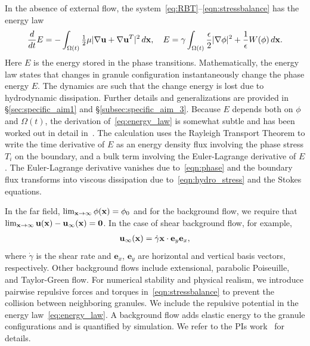 In the absence of external flow, the
system~\eqref{eq:RBT}--\eqref{eqn:stressbalance} has the energy law
\begin{align}
\label{eq:energy_law}
  \frac{d}{dt}E
  = - \int_{\Omega(t)}\tfrac{1}{2}\mu|\nabla \mathbf{u} + \nabla
  \mathbf{u}^T|^2 \,d\mathbf{x},\quad
    E = \gamma \int_{\Omega(t)}
  \frac{\epsilon}{2} |\nabla \phi|^2 + \frac{1}{\epsilon} W(\phi) \,d\mathbf{x}.
\end{align}
Here $E$ is the energy stored in the phase transitions. Mathematically,
the energy law states that changes in granule configuration
instantaneously change the phase energy $E$. The dynamics are such that
the change energy is lost due to hydrodynamic dissipation. Further
details and generalizations are provided in \S\ref{sec:specific_aim1}
and \S\ref{subsec:specific_aim_3}. Because $E$ depends both on $\phi$
and $\Omega(t)$, the derivation of~\eqref{eq:energy_law} is somewhat
subtle and has been worked out in detail in~\cite{Fu2018_SIAM}. The
calculation uses the Rayleigh Transport Theorem to write the time
derivative of $E$ as an energy density flux involving the phase stress
$T_i$ on the boundary, and a bulk term involving the Euler-Lagrange
derivative of $E$. The Euler-Lagrange derivative vanishes due
to~\eqref{eqn:phase} and the boundary flux transforms into viscous
dissipation due to~\eqref{eqn:hydro_stress} and the Stokes equations. 


In the far field, $\lim_{\mathbf{x} \to \infty} \phi(\mathbf{x}) = \phi_0$ and for the
background flow, we require that $\lim_{\mathbf{x} \to \infty} \mathbf{u}(\mathbf{x}) -
\mathbf{u}_{\infty}(\mathbf{x}) = \mathbf{0}$. In the case of shear background flow,
for example,
\begin{align}
\label{eqn:shear_BG_flow}
\mathbf{u}_{\infty}(\mathbf{x}) = \dot{\gamma} \mathbf{x} \cdot \mathbf{e}_y \mathbf{e}_x,
\end{align}
where $\dot \gamma$ is the shear rate and $\mathbf{e}_x$, $\mathbf{e}_y$
are horizontal and vertical basis vectors, respectively. Other
background flows include extensional, parabolic Poiseuille, and
Taylor-Green flow. For numerical stability and physical realism, we
introduce pairwise repulsive forces and torques
in~\eqref{eqn:stressbalance} to prevent the collision between
neighboring granules. We include the repulsive potential in the energy
law~\eqref{eq:energy_law}. A background flow adds elastic energy to the
granule configurations and is quantified by simulation. We refer to the
PIs work~\cite{FuQuRyYo22, fu-ryh-qua-you2022, Fu2018_SIAM} for details. 

